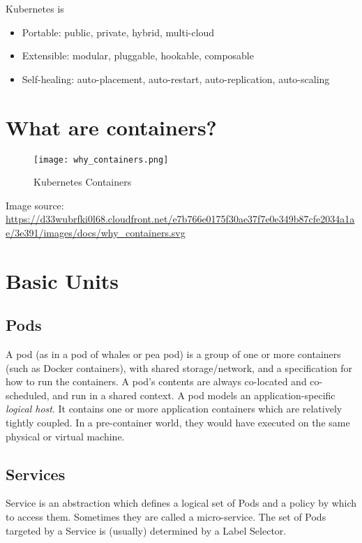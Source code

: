 Kubernetes is

\begin{itemize}

\item
  Portable: public, private, hybrid, multi-cloud
\item
  Extensible: modular, pluggable, hookable, composable
\item
  Self-healing: auto-placement, auto-restart, auto-replication,
  auto-scaling
\end{itemize}

\section{What are containers?}\label{what-are-containers}

\begin{figure}[htbp]
\centering
\texttt{[image: why\_containers.png]}
\caption{Kubernetes Containers}
\end{figure}

Image source:
\url{https://d33wubrfki0l68.cloudfront.net/e7b766e0175f30ae37f7e0e349b87cfe2034a1ae/3e391/images/docs/why_containers.svg}

\section{Basic Units}\label{basic-units}

\subsection{Pods}\label{pods}

A pod (as in a pod of whales or pea pod) is a group of one or more
containers (such as Docker containers), with shared storage/network, and
a specification for how to run the containers. A pod's contents are
always co-located and co-scheduled, and run in a shared context. A pod
models an application-specific \textit{logical host}. It contains one or
more application containers which are relatively tightly coupled. In
a pre-container world, they would have executed on the same physical or
virtual machine.

\subsection{Services}\label{services}

Service is an abstraction which defines a logical set of Pods and a
policy by which to access them. Sometimes they are called a
micro-service. The set of Pods targeted by a Service is (usually)
determined by a Label Selector.

